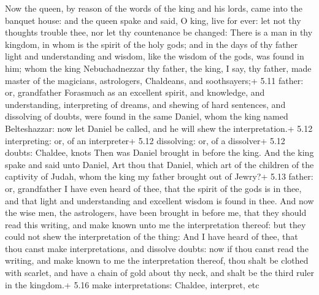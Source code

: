  Now the queen, by reason of the words of the king and
his lords, came into the banquet house: and the queen spake and said, O
king, live for ever: let not thy thoughts trouble thee, nor let thy
countenance be changed:  There is a man in thy kingdom, in
whom is the spirit of the holy gods; and in the days of thy father light
and understanding and wisdom, like the wisdom of the gods, was found in
him; whom the king Nebuchadnezzar thy father, the king, I say, thy
father, made master of the magicians, astrologers, Chaldeans, and
soothsayers;+ 5.11 father: or, grandfather  Forasmuch as an
excellent spirit, and knowledge, and understanding, interpreting of
dreams, and shewing of hard sentences, and dissolving of doubts, were
found in the same Daniel, whom the king named Belteshazzar: now let
Daniel be called, and he will shew the interpretation.+ 5.12
interpreting: or, of an interpreter+ 5.12 dissolving: or, of a
dissolver+ 5.12 doubts: Chaldee, knots  Then was Daniel
brought in before the king. And the king spake and said unto Daniel, Art
thou that Daniel, which art of the children of the captivity of Judah,
whom the king my father brought out of Jewry?+ 5.13 father: or,
grandfather  I have even heard of thee, that the spirit of
the gods is in thee, and that light and understanding and excellent
wisdom is found in thee.  And now the wise men, the
astrologers, have been brought in before me, that they should read this
writing, and make known unto me the interpretation thereof: but they
could not shew the interpretation of the thing:  And I have
heard of thee, that thou canst make interpretations, and dissolve
doubts: now if thou canst read the writing, and make known to me the
interpretation thereof, thou shalt be clothed with scarlet, and have a
chain of gold about thy neck, and shalt be the third ruler in the
kingdom.+ 5.16 make interpretations: Chaldee, interpret, etc

